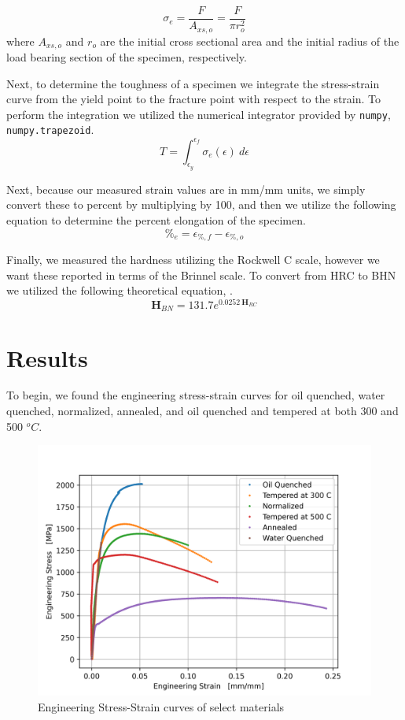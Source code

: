 \documentclass{article}
\begin{document}
\begin{equation}
    \sigma_e = \frac{F}{A_{xs,o}} = \frac{F}{\pi r_{o}^2}
\end{equation}
where $A_{xs,o}$ and $r_o$ are the initial cross sectional area and the initial radius of the load bearing section of the specimen, respectively. 

Next, to determine the toughness of a specimen we integrate the stress-strain curve from the yield point to the fracture point with respect to the strain. To perform the integration we utilized the numerical integrator provided by \texttt{numpy}, \texttt{numpy.trapezoid}. 
\begin{equation}
    T = \int_{\epsilon_{y}}^{\epsilon_{f}}\sigma_e\left(\epsilon\right)\ d\epsilon
\end{equation}

Next, because our measured strain values are in mm/mm units, we simply convert these to percent by multiplying by 100, and then we utilize the following equation to determine the percent elongation of the specimen.
\begin{equation}
    \%_{e} = \epsilon_{\%,f} -\epsilon_{\%,o}
\end{equation}

Finally, we measured the hardness utilizing the Rockwell C scale, however we want these reported in terms of the Brinnel scale. To convert from HRC to BHN we utilized the following theoretical equation, \cite{manual}.
\begin{equation}
    \textbf{H}_{BN} = 131.7 e^{0.0252\:\textbf{H}_{RC}}
    \label{eq:rc2br}
\end{equation}

\newpage
\section{Results}
To begin, we found the engineering stress-strain curves for oil quenched, water quenched, normalized, annealed, and oil quenched and tempered at both 300 and 500 $^oC$. 

\begin{figure}[!h!]
    \centering
    \includegraphics[width=0.5\linewidth]{Lab5/plots/q1_adjusted.png}
    \caption{Engineering Stress-Strain curves of select materials}
    \label{fig:q1-all}
\end{figure}
\end{document}
